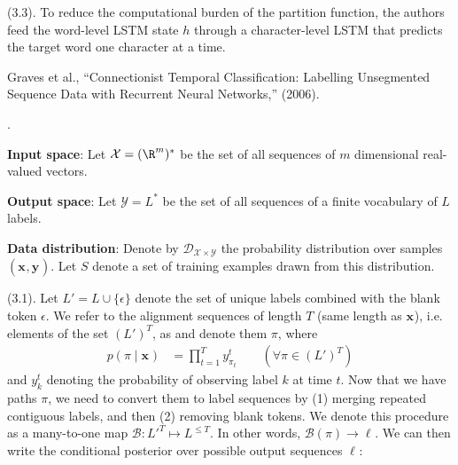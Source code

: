 \documentclass[11pt]{article}
\renewcommand\vec[2][]{\bm{#2}_{#1}}
\newcommand\myspace[1][]{\vspace{#1\bigskipamount}}
\newcommand\p{\Needspace{10\baselineskip} \noindent}
\begin{document}
\myspace
\p {} (3.3). To reduce the computational burden of the partition function, the authors feed the word-level LSTM state $h$ through a character-level LSTM that predicts the target word one character at a time.













\vspace{-1em}
{\footnotesize Graves et al., ``Connectionist Temporal Classification: Labelling Unsegmented Sequence Data with Recurrent Neural Networks,'' (2006).}

\p {}.

\begin{compactitem}
	\item \textbf{Input space}: Let $\mathcal X = (\R^m)^*$ be the set of all sequences of $m$ dimensional real-valued vectors. 
	
	\item \textbf{Output space}: Let $\mathcal{Y} = L^*$ be the set of all sequences of a finite vocabulary of $L$ labels. 
	
	\item \textbf{Data distribution}: Denote by $\mathcal{D}_{\mathcal X \times \mathcal Y}$ the probability distribution over samples $(\vec x, \vec y)$. Let $S$ denote a set of training examples drawn from this distribution. 
\end{compactitem}

\myspace
\p {} (3.1). Let $L' = L \cup \{ \epsilon \}$ denote the set of unique labels combined with the blank token $\epsilon$. We refer to the alignment sequences of length $T$ (same length as $\vec x$), i.e. elements of the set $(L')^T$, as  and denote them $\pi$, where
\begin{align}
	p(\pi \mid \vec x)
		&= \prod_{t=1}^{T} y_{\pi_t}^t \qquad (\forall \pi \in (L')^T)
\end{align}
and $y_k^t$ denoting the probability of observing label $k$ at time $t$. Now that we have paths $\pi$, we need to convert them to label sequences by (1) merging repeated contiguous labels, and then (2) removing blank tokens. We denote this procedure as a many-to-one map $\mathcal{B} : L'^T \mapsto L^{\le T}$. In other words, $\mathcal B (\pi) \rightarrow \vec\ell$. We can then write the conditional posterior over possible output sequences $\vec\ell$:
\graybox{
	p(\vec\ell \mid \vec x)
		&= \sum_{\pi \in \mathcal{B}^{-1}(\vec\ell)} p(\pi \mid \vec x)
}
\end{document}
